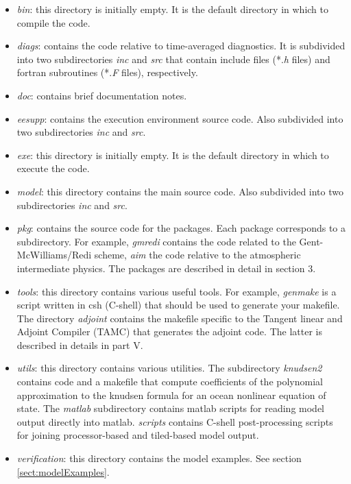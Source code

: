 \begin{itemize}
\item \textit{bin}: this directory is initially empty. It is the default
directory in which to compile the code.

\item \textit{diags}: contains the code relative to time-averaged
diagnostics. It is subdivided into two subdirectories \textit{inc} and 
\textit{src} that contain include files (*.\textit{h} files) and fortran
subroutines (*.\textit{F} files), respectively.

\item \textit{doc}: contains brief documentation notes.

\item \textit{eesupp}: contains the execution environment source code. Also
subdivided into two subdirectories \textit{inc} and \textit{src}.

\item \textit{exe}: this directory is initially empty. It is the default
directory in which to execute the code.

\item \textit{model}: this directory contains the main source code. Also
subdivided into two subdirectories \textit{inc} and \textit{src}.

\item \textit{pkg}: contains the source code for the packages. Each package
corresponds to a subdirectory. For example, \textit{gmredi} contains the
code related to the Gent-McWilliams/Redi scheme, \textit{aim} the code
relative to the atmospheric intermediate physics. The packages are described
in detail in section 3.

\item \textit{tools}: this directory contains various useful tools. For
example, \textit{genmake} is a script written in csh (C-shell) that should
be used to generate your makefile. The directory \textit{adjoint} contains
the makefile specific to the Tangent linear and Adjoint Compiler (TAMC) that
generates the adjoint code. The latter is described in details in part V.

\item \textit{utils}: this directory contains various utilities. The
subdirectory \textit{knudsen2} contains code and a makefile that
compute coefficients of the polynomial approximation to the knudsen
formula for an ocean nonlinear equation of state. The \textit{matlab}
subdirectory contains matlab scripts for reading model output directly
into matlab. \textit{scripts} contains C-shell post-processing
scripts for joining processor-based and tiled-based model output.

\item \textit{verification}: this directory contains the model examples. See
section \ref{sect:modelExamples}.
\end{itemize}

